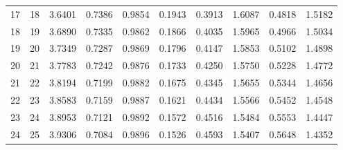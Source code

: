 \documentclass{article}
\begin{document}
\begin{tabular}{rrrrrrrrrr}
  17 &    18 & 3.6401 & 0.7386 & 0.9854 & 0.1943 & 0.3913 & 1.6087 & 0.4818 & 1.5182 \\ 
  18 &    19 & 3.6890 & 0.7335 & 0.9862 & 0.1866 & 0.4035 & 1.5965 & 0.4966 & 1.5034 \\ 
  19 &    20 & 3.7349 & 0.7287 & 0.9869 & 0.1796 & 0.4147 & 1.5853 & 0.5102 & 1.4898 \\ 
  20 &    21 & 3.7783 & 0.7242 & 0.9876 & 0.1733 & 0.4250 & 1.5750 & 0.5228 & 1.4772 \\ 
  21 &    22 & 3.8194 & 0.7199 & 0.9882 & 0.1675 & 0.4345 & 1.5655 & 0.5344 & 1.4656 \\ 
  22 &    23 & 3.8583 & 0.7159 & 0.9887 & 0.1621 & 0.4434 & 1.5566 & 0.5452 & 1.4548 \\ 
  23 &    24 & 3.8953 & 0.7121 & 0.9892 & 0.1572 & 0.4516 & 1.5484 & 0.5553 & 1.4447 \\ 
  24 &    25 & 3.9306 & 0.7084 & 0.9896 & 0.1526 & 0.4593 & 1.5407 & 0.5648 & 1.4352 \\ 
   \hline
\end{tabular}
\end{document}
